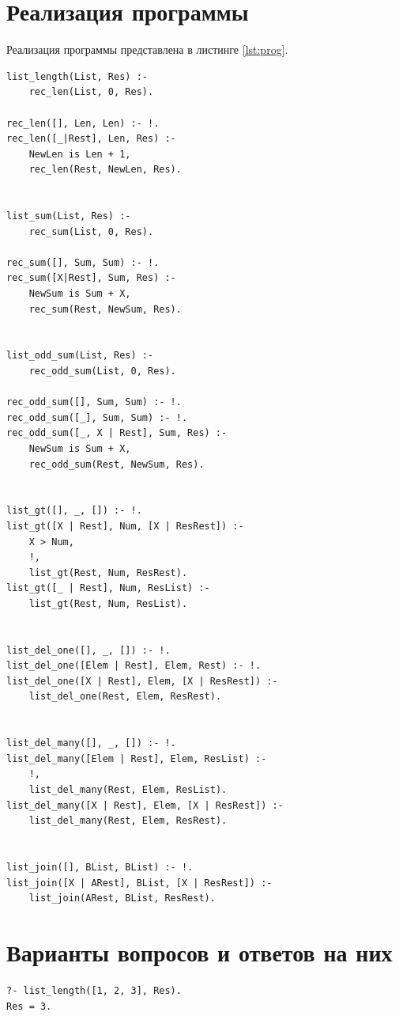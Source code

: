 \section{Реализация программы}

Реализация программы представлена в листинге \ref{lst:prog}.

\begin{lstlisting}[caption={Реализация программы}, label={lst:prog}]
list_length(List, Res) :-
    rec_len(List, 0, Res).

rec_len([], Len, Len) :- !.
rec_len([_|Rest], Len, Res) :-
    NewLen is Len + 1,
    rec_len(Rest, NewLen, Res).


list_sum(List, Res) :-
    rec_sum(List, 0, Res).

rec_sum([], Sum, Sum) :- !.
rec_sum([X|Rest], Sum, Res) :-
    NewSum is Sum + X,
    rec_sum(Rest, NewSum, Res).


list_odd_sum(List, Res) :-
    rec_odd_sum(List, 0, Res).

rec_odd_sum([], Sum, Sum) :- !.
rec_odd_sum([_], Sum, Sum) :- !.
rec_odd_sum([_, X | Rest], Sum, Res) :-
    NewSum is Sum + X,
    rec_odd_sum(Rest, NewSum, Res).


list_gt([], _, []) :- !.
list_gt([X | Rest], Num, [X | ResRest]) :-
    X > Num,
    !,
    list_gt(Rest, Num, ResRest).
list_gt([_ | Rest], Num, ResList) :-
    list_gt(Rest, Num, ResList).


list_del_one([], _, []) :- !.
list_del_one([Elem | Rest], Elem, Rest) :- !.
list_del_one([X | Rest], Elem, [X | ResRest]) :-
    list_del_one(Rest, Elem, ResRest).


list_del_many([], _, []) :- !.
list_del_many([Elem | Rest], Elem, ResList) :-
    !,
    list_del_many(Rest, Elem, ResList).
list_del_many([X | Rest], Elem, [X | ResRest]) :-
    list_del_many(Rest, Elem, ResRest).


list_join([], BList, BList) :- !.
list_join([X | ARest], BList, [X | ResRest]) :-
    list_join(ARest, BList, ResRest).

\end{lstlisting}

\section{Варианты вопросов и ответов на них}

\begin{lstlisting}[caption={Вопрос и ответ №1}, label={lst:q1}]
?- list_length([1, 2, 3], Res).
Res = 3.
\end{lstlisting}

